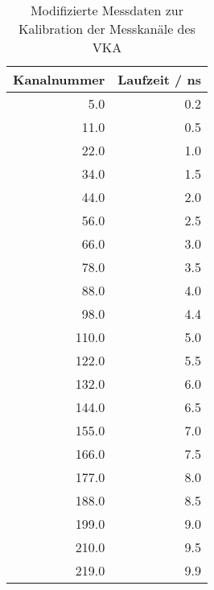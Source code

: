 \begin{table}
\centering
\begin{tabular}{rr}
\toprule
 Kanalnummer &  Laufzeit / ns \\
\midrule
         5.0 &            0.2 \\
        11.0 &            0.5 \\
        22.0 &            1.0 \\
        34.0 &            1.5 \\
        44.0 &            2.0 \\
        56.0 &            2.5 \\
        66.0 &            3.0 \\
        78.0 &            3.5 \\
        88.0 &            4.0 \\
        98.0 &            4.4 \\
       110.0 &            5.0 \\
       122.0 &            5.5 \\
       132.0 &            6.0 \\
       144.0 &            6.5 \\
       155.0 &            7.0 \\
       166.0 &            7.5 \\
       177.0 &            8.0 \\
       188.0 &            8.5 \\
       199.0 &            9.0 \\
       210.0 &            9.5 \\
       219.0 &            9.9 \\
\bottomrule
\end{tabular}
\caption{Modifizierte Messdaten zur Kalibration der Messkanäle des VKA}
\label{tab:calib}
\end{table}